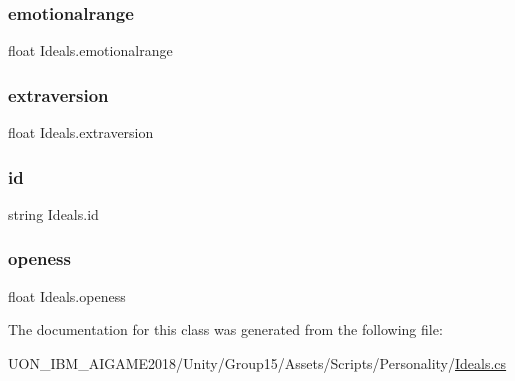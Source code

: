 \mbox{\label{class_ideals_aaa63cb593d1e86816d23ee6321d59427}} 
\subsubsection{\texorpdfstring{emotionalrange}{emotionalrange}}
{\footnotesize\ttfamily float Ideals.\+emotionalrange}

\mbox{\label{class_ideals_ad5b55c25cbf73153ea017d8ed3c708b2}} 
\subsubsection{\texorpdfstring{extraversion}{extraversion}}
{\footnotesize\ttfamily float Ideals.\+extraversion}

\mbox{\label{class_ideals_a29f7b5096a6864440086554867f3e12c}} 
\subsubsection{\texorpdfstring{id}{id}}
{\footnotesize\ttfamily string Ideals.\+id}

\mbox{\label{class_ideals_a648763f2b5d91dda9358164ee1756274}} 
\subsubsection{\texorpdfstring{openess}{openess}}
{\footnotesize\ttfamily float Ideals.\+openess}



The documentation for this class was generated from the following file\+:\begin{DoxyCompactItemize}
\item 
U\+O\+N\+\_\+\+I\+B\+M\+\_\+\+A\+I\+G\+A\+M\+E2018/\+Unity/\+Group15/\+Assets/\+Scripts/\+Personality/\mbox{\hyperlink{_ideals_8cs}{Ideals.\+cs}}\end{DoxyCompactItemize}
